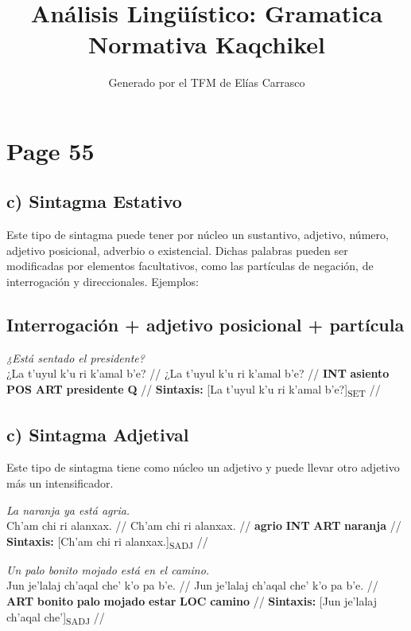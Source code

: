 \documentclass{article}%
\title{Análisis Lingüístico: Gramatica Normativa Kaqchikel}%
\author{Generado por el TFM de Elías Carrasco}%
\begin{document}
%
\normalsize%
\maketitle%
\section{Page 55}%
\label{sec:Page55}%
\subsection{c) Sintagma Estativo}%
\label{subsec:c)SintagmaEstativo}%

%
Este tipo de sintagma puede tener por núcleo un sustantivo, adjetivo, número, adjetivo %
posicional, adverbio o existencial. Dichas palabras pueden ser modificadas por %
elementos facultativos, como las partículas de negación, de interrogación y direccionales. %
Ejemplos: %
\subsection{Interrogación + adjetivo posicional + partícula}%
\label{subsec:Interrogacin+adjetivoposicional+partcula}%

%
\par\medskip%
\ex
\textit{¿Está sentado el presidente?} \\
\begingl
\gla ¿La t’uyul k’u ri k’amal b'e? //
\glb ¿La t’uyul k’u ri k’amal b'e? //
\glc \textbf{INT} \textbf{asiento} \textbf{POS} \textbf{ART} \textbf{presidente} \textbf{Q} //
\glft \textbf{Sintaxis:} [La t’uyul k’u ri k’amal b'e?]\textsubscript{SET} //
\endgl
\xe
%
\medskip%
\subsection{c) Sintagma Adjetival}%
\label{subsec:c)SintagmaAdjetival}%

%
Este tipo de sintagma tiene como núcleo un adjetivo y puede llevar otro adjetivo más un %
intensificador. %
\par\medskip%
\ex
\textit{La naranja ya está agria.} \\
\begingl
\gla Ch'am chi ri alanxax. //
\glb Ch'am chi ri alanxax. //
\glc \textbf{agrio} \textbf{INT} \textbf{ART} \textbf{naranja} //
\glft \textbf{Sintaxis:} [Ch'am chi ri alanxax.]\textsubscript{SADJ} //
\endgl
\xe
%
\medskip%
\par\medskip%
\ex
\textit{Un palo bonito mojado está en el camino.} \\
\begingl
\gla Jun je’lalaj ch’aqal che' k'o pa b'e. //
\glb Jun je’lalaj ch’aqal che' k'o pa b'e. //
\glc \textbf{ART} \textbf{bonito} \textbf{palo} \textbf{mojado} \textbf{estar} \textbf{LOC} \textbf{camino} //
\glft \textbf{Sintaxis:} [Jun je’lalaj ch’aqal che']\textsubscript{SADJ} //
\endgl
\xe
%
\medskip%
\end{document}
